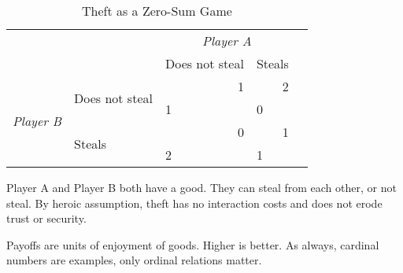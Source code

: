 \begin{table}
	\caption[The Theft Game]{Theft as a Zero-Sum Game}
	\label{tab:theft}
	\begin{center}
	\begin{tabular}
		{m{1cm}
		m{}
		m{}
		m{}
		m{}}


& %
& \multicolumn{2}{c}{\emph{Player A}}
\\


& %
&Does not steal
&Steals
\\

\cline{3-4}

\multicolumn{1}{c}{\multirow{4}{*}{\emph{Player B}}}
& \multirow{2}{2,3cm}{Does not steal}
& 	\multicolumn{1}{|r|}{1}
& \multicolumn{1}{r|}{2}
\\


\multicolumn{1}{c}{}
& \multicolumn{1}{c}{}
& \multicolumn{1}{|l|}{1}
& \multicolumn{1}{l|}{0}
\\

\cline{3-4}

\multicolumn{1}{c}{}
& \multirow{2}{2,3cm}{Steals}
& \multicolumn{1}{|r|}{0}
& \multicolumn{1}{r|}{1}
\\


\multicolumn{1}{c}{}
& \multicolumn{1}{c}{}
& \multicolumn{1}{|l|}{2}
& \multicolumn{1}{l|}{1}
\\

\cline{3-4}

\end{tabular}
\end{center}

	\scriptsize{
		Player A and Player B both have a good.
		They can steal from each other, or not steal.
		By heroic assumption, theft has no interaction costs and does not erode trust or security.

		Payoffs are units of enjoyment of goods.
		Higher is better.
		As always, cardinal numbers are examples, only ordinal relations matter.}
\end{table}


